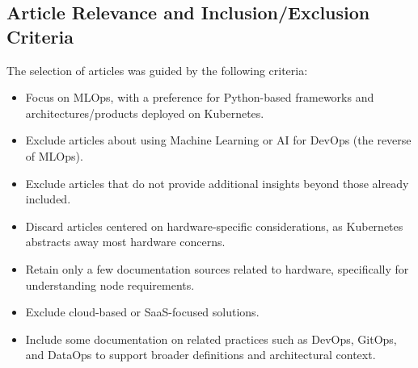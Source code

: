 \subsection{Article Relevance and Inclusion/Exclusion Criteria}\label{subsec:articles-relevance-and-inclusion/exclusion-criteria}

The selection of articles was guided by the following criteria:
\begin{itemize}
    \item Focus on MLOps, with a preference for Python-based frameworks and architectures/products deployed on Kubernetes.
    \item Exclude articles about using Machine Learning or AI for DevOps (the reverse of MLOps).
    \item Exclude articles that do not provide additional insights beyond those already included.
    \item Discard articles centered on hardware-specific considerations, as Kubernetes abstracts away most hardware concerns.
    \item Retain only a few documentation sources related to hardware, specifically for understanding node requirements.
    \item Exclude cloud-based or SaaS-focused solutions.
    \item Include some documentation on related practices such as DevOps, GitOps, and DataOps to support broader definitions and architectural context.
\end{itemize}